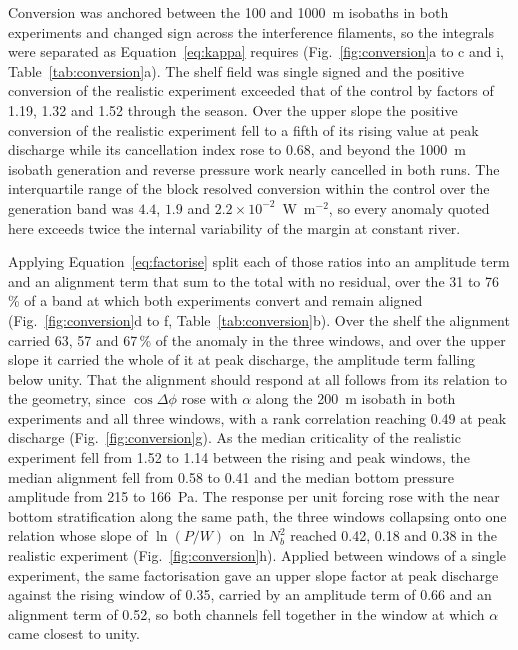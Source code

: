 \documentclass[a4paper,fleqn]{cas-sc}
\begin{document}
Conversion was anchored between the 100 and 1000~m isobaths in both experiments and changed sign across the interference filaments, so the integrals were separated as Equation~\ref{eq:kappa} requires (Fig.~\ref{fig:conversion}a to c and i, Table~\ref{tab:conversion}a). The shelf field was single signed and the positive conversion of the realistic experiment exceeded that of the control by factors of 1.19, 1.32 and 1.52 through the season. Over the upper slope the positive conversion of the realistic experiment fell to a fifth of its rising value at peak discharge while its cancellation index rose to 0.68, and beyond the 1000~m isobath generation and reverse pressure work nearly cancelled in both runs. The interquartile range of the block resolved conversion within the control over the generation band was $4.4$, $1.9$ and $2.2\times10^{-2}$~W~m$^{-2}$, so every anomaly quoted here exceeds twice the internal variability of the margin at constant river.

Applying Equation~\ref{eq:factorise} split each of those ratios into an amplitude term and an alignment term that sum to the total with no residual, over the 31 to 76\,\% of a band at which both experiments convert and remain aligned (Fig.~\ref{fig:conversion}d to f, Table~\ref{tab:conversion}b). Over the shelf the alignment carried 63, 57 and 67\,\% of the anomaly in the three windows, and over the upper slope it carried the whole of it at peak discharge, the amplitude term falling below unity. That the alignment should respond at all follows from its relation to the geometry, since $\cos\Delta\phi$ rose with $\alpha$ along the 200~m isobath in both experiments and all three windows, with a rank correlation reaching 0.49 at peak discharge (Fig.~\ref{fig:conversion}g). As the median criticality of the realistic experiment fell from 1.52 to 1.14 between the rising and peak windows, the median alignment fell from 0.58 to 0.41 and the median bottom pressure amplitude from 215 to 166~Pa. The response per unit forcing rose with the near bottom stratification along the same path, the three windows collapsing onto one relation whose slope of $\ln(P/W)$ on $\ln N_{b}^{2}$ reached 0.42, 0.18 and 0.38 in the realistic experiment (Fig.~\ref{fig:conversion}h). Applied between windows of a single experiment, the same factorisation gave an upper slope factor at peak discharge against the rising window of 0.35, carried by an amplitude term of 0.66 and an alignment term of 0.52, so both channels fell together in the window at which $\alpha$ came closest to unity. 
\end{document}
